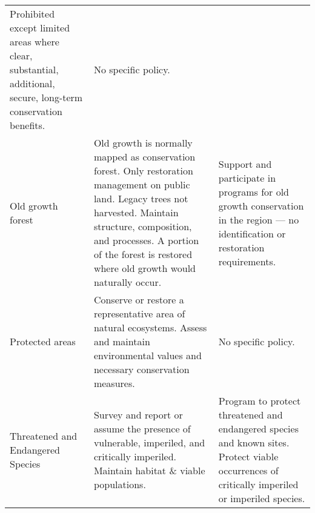 \begin{table}
\begin{longtable}[]{@{}lll@{}}
\begin{minipage}[t]{0.36\columnwidth}
Prohibited except limited areas where clear, substantial, additional,
secure, long-term conservation benefits.\strut
\end{minipage} & \begin{minipage}[t]{0.36\columnwidth}\raggedright\strut
No specific policy.\strut
\end{minipage}\tabularnewline
\begin{minipage}[t]{0.20\columnwidth}\raggedright\strut
Old growth forest\strut
\end{minipage} & \begin{minipage}[t]{0.36\columnwidth}\raggedright\strut
Old growth is normally mapped as conservation forest. Only restoration
management on public land. Legacy trees not harvested. Maintain
structure, composition, and processes. A portion of the forest is
restored where old growth would naturally occur.\strut
\end{minipage} & \begin{minipage}[t]{0.36\columnwidth}\raggedright\strut
Support and participate in programs for old growth conservation in the
region --- no identification or restoration requirements.\strut
\end{minipage}\tabularnewline
\begin{minipage}[t]{0.20\columnwidth}\raggedright\strut
Protected areas\strut
\end{minipage} & \begin{minipage}[t]{0.36\columnwidth}\raggedright\strut
Conserve or restore a representative area of natural ecosystems. Assess
and maintain environmental values and necessary conservation
measures.\strut
\end{minipage} & \begin{minipage}[t]{0.36\columnwidth}\raggedright\strut
No specific policy.\strut
\end{minipage}\tabularnewline
\begin{minipage}[t]{0.20\columnwidth}\raggedright\strut
Threatened and Endangered Species\strut
\end{minipage} & \begin{minipage}[t]{0.36\columnwidth}\raggedright\strut
Survey and report or assume the presence of vulnerable, imperiled, and
critically imperiled. Maintain habitat \& viable populations.\strut
\end{minipage} & \begin{minipage}[t]{0.36\columnwidth}\raggedright\strut
Program to protect threatened and endangered species and known sites.
Protect viable occurrences of critically imperiled or imperiled
species.\strut
\end{minipage}\tabularnewline
\bottomrule
\end{longtable}


\end{table}

